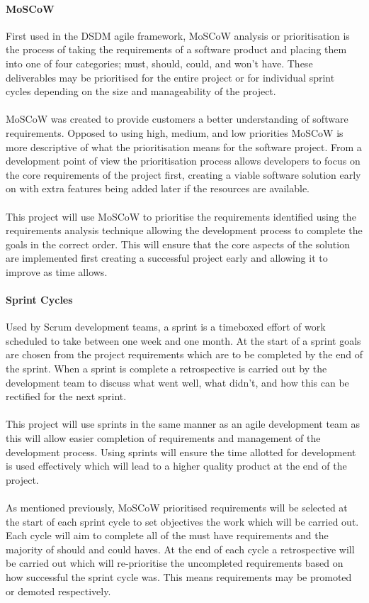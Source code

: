 		\paragraph{MoSCoW}
			First used in the DSDM agile framework, MoSCoW analysis or prioritisation is the process of taking the requirements of a software product and placing them into one of four categories; must, should, could, and won't have. These deliverables may be prioritised for the entire project or for individual sprint cycles depending on the size and manageability of the project.
			\\\\
			MoSCoW was created to provide customers a better understanding of software requirements. Opposed to using high, medium, and low priorities MoSCoW is more descriptive of what the prioritisation means for the software project. From a development point of view the prioritisation process allows developers to focus on the core requirements of the project first, creating a viable software solution early on with extra features being added later if the resources are available.
			\\\\
			This project will use MoSCoW to prioritise the requirements identified using the requirements analysis technique allowing the development process to complete the goals in the correct order. This will ensure that the core aspects of the solution are implemented first creating a successful project early and allowing it to improve as time allows.
		\paragraph{Sprint Cycles}
			Used by Scrum development teams, a sprint is a timeboxed effort of work scheduled to take between one week and one month. At the start of a sprint goals are chosen from the project requirements which are to be completed by the end of the sprint. When a sprint is complete a retrospective is carried out by the development team to discuss what went well, what didn't, and how this can be rectified for the next sprint.
			\\\\
			This project will use sprints in the same manner as an agile development team as this will allow easier completion of requirements and management of the development process. Using sprints will ensure the time allotted for development is used effectively which will lead to a higher quality product at the end of the project.
			\\\\
			As mentioned previously, MoSCoW prioritised requirements will be selected at the start of each sprint cycle to set objectives the work which will be carried out. Each cycle will aim to complete all of the must have requirements and the majority of should and could haves. At the end of each cycle a retrospective will be carried out which will re-prioritise the uncompleted requirements based on how successful the sprint cycle was. This means requirements may be promoted or demoted respectively.
